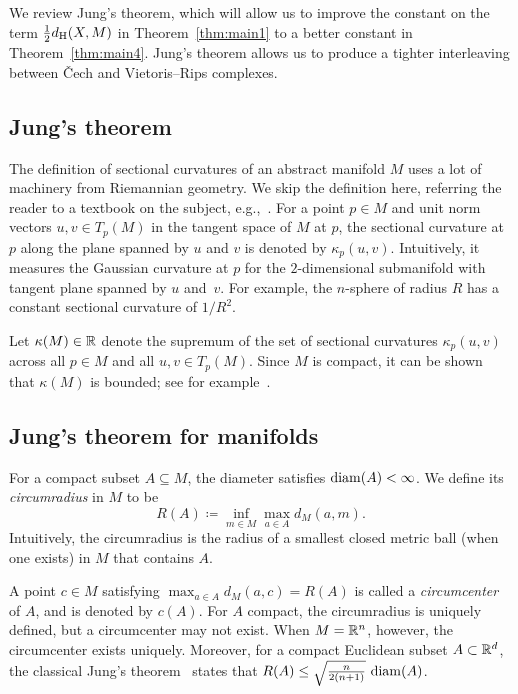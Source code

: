 \documentclass[11pt, reqno, english]{amsart}
\begin{document}
We review Jung's theorem, which will allow us to improve the constant on the term $\frac{1}{2}d_{\mathrm{H}}(X,M)$ in Theorem~\ref{thm:main1} to a better constant in Theorem~\ref{thm:main4}.
Jung's theorem allows us to produce a tighter interleaving between \v{C}ech and Vietoris--Rips complexes.

\subsection*{Jung's theorem}
The definition of sectional curvatures of an abstract manifold $M$ uses a lot of machinery from Riemannian geometry.
We skip the definition here, referring the reader to a textbook on the subject, e.g.,~\cite[Chapter 9]{BishopRichardL2001Gom}. 
For a point $p\in M$ and unit norm vectors $u,v\in T_p(M)$ in the tangent space of $M$ at $p$, the sectional curvature at $p$ along the plane spanned by $u$ and $v$ is denoted by $\kappa_p(u,v)$.
Intuitively, it measures the Gaussian curvature at $p$ for the $2$-dimensional submanifold with tangent plane spanned by $u$ and~$v$.
For example, the $n$-sphere of radius $R$ has a constant sectional curvature of $1/R^2$.

Let $\kappa(M)\in\mathbb{R}$ denote the supremum of the set of sectional curvatures $\kappa_p(u,v)$ across all $p\in M$ and all $u,v \in T_p(M)$.
Since $M$ is compact, it can be shown that $\kappa(M)$ is bounded; see for example~\cite[p.~166]{BishopRichardL2001Gom}. 

\subsection*{Jung's theorem for manifolds}
For a compact subset $A\subseteq M$, the diameter satisfies $\mathrm{diam}(A)<\infty$.
We define its \emph{circumradius} in $M$ to be
\[
R(A)\coloneqq \inf_{m\in M}\max_{a\in A}d_M(a,m).
\]
Intuitively, the circumradius is the radius of a smallest closed metric ball (when one exists) in $M$ that contains $A$. 

A point $c\in M$ satisfying $\max_{a\in A}d_M(a ,c)=R(A)$ is called a \emph{circumcenter} of $A$, and is denoted by $c(A)$.
For $A$ compact, the circumradius is uniquely defined, but a circumcenter may not exist.
When $M=\mathbb{R}^n$, however, the circumcenter exists uniquely. 
Moreover, for a compact Euclidean subset $A\subset\mathbb{R}^d$, the classical Jung's theorem~\cite[Theorem 2.6]{danzer1963helly} states that $R(A)\leq\sqrt{\tfrac{n}{2(n+1)}}~\mathrm{diam}(A)$.
\end{document}
